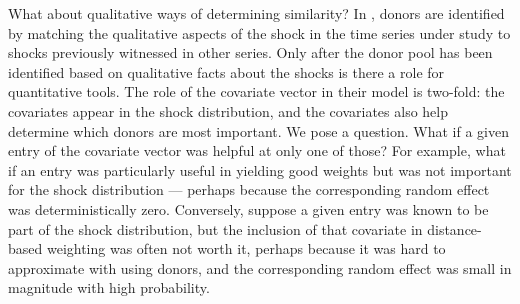 \documentclass[11pt]{article}
\theoremstyle{definition}
\begin{document}
What about qualitative ways of determining similarity?  In \cite{lin2021minimizing, lundquist2024volatility}, donors are identified by matching the qualitative aspects of the shock in the time series under study to shocks previously witnessed in other series.  Only after the donor pool has been identified based on qualitative facts about the shocks is there a role for quantitative tools.  The role of the covariate vector in their model is two-fold: the covariates appear in the shock distribution, and the covariates also help determine which donors are most important.  We pose a question.  What if a given entry of the covariate vector was helpful at only one of those?  For example, what if an entry was particularly useful in yielding good weights but was not important for the shock distribution --- perhaps because the corresponding random effect was deterministically zero.  Conversely, suppose a given entry was known to be part of the shock distribution, but the inclusion of that covariate in distance-based weighting was often not worth it, perhaps because it was hard to approximate with using donors, and the corresponding random effect was small in magnitude with high probability.




\end{document}
